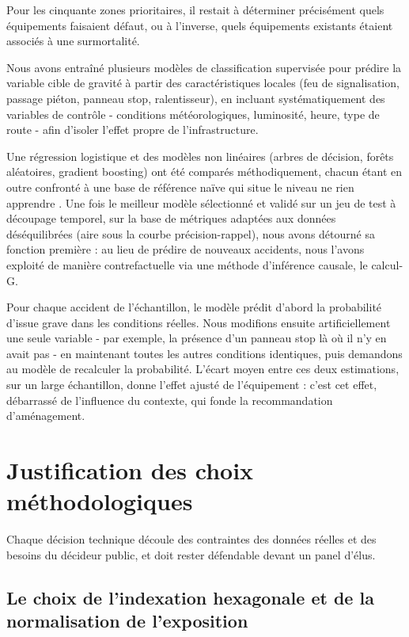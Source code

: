 \documentclass[12pt, a4paper]{article}
\begin{document}
Pour les cinquante zones prioritaires, il restait à déterminer précisément quels équipements faisaient défaut, ou à l'inverse, quels équipements existants étaient associés à une surmortalité.

Nous avons entraîné plusieurs modèles de classification supervisée pour prédire la variable cible de gravité à partir des caractéristiques locales (feu de signalisation, passage piéton, panneau stop, ralentisseur), en incluant systématiquement des variables de contrôle - conditions météorologiques, luminosité, heure, type de route - afin d'isoler l'effet propre de l'infrastructure.

Une régression logistique et des modèles non linéaires (arbres de décision, forêts aléatoires, gradient boosting) ont été comparés méthodiquement, chacun étant en outre confronté à une base de référence naïve qui situe le niveau \og ne rien apprendre \fg{}. Une fois le meilleur modèle sélectionné et validé sur un jeu de test à découpage temporel, sur la base de métriques adaptées aux données déséquilibrées (aire sous la courbe précision-rappel), nous avons détourné sa fonction première : au lieu de prédire de nouveaux accidents, nous l'avons exploité de manière contrefactuelle via une méthode d'inférence causale, le calcul-G.

Pour chaque accident de l'échantillon, le modèle prédit d'abord la probabilité d'issue grave dans les conditions réelles. Nous modifions ensuite artificiellement une seule variable - par exemple, la présence d'un panneau stop là où il n'y en avait pas - en maintenant toutes les autres conditions identiques, puis demandons au modèle de recalculer la probabilité. L'écart moyen entre ces deux estimations, sur un large échantillon, donne l'effet ajusté de l'équipement : c'est cet effet, débarrassé de l'influence du contexte, qui fonde la recommandation d'aménagement.

\section{Justification des choix méthodologiques}

Chaque décision technique découle des contraintes des données réelles et des besoins du décideur public, et doit rester défendable devant un panel d'élus.

\subsection{Le choix de l'indexation hexagonale et de la normalisation de l'exposition}
\end{document}
